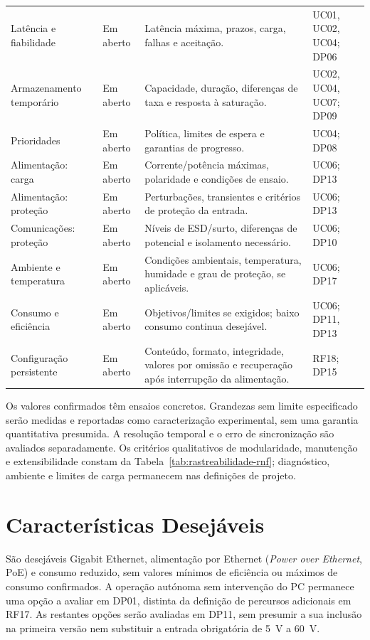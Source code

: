 \begin{longtable}{@{}>{\raggedright\arraybackslash}p{}>{\raggedright\arraybackslash}p{}>{\raggedright\arraybackslash}p{}>{\raggedright\arraybackslash}p{}@{}}
Latência e fiabilidade & Em aberto & Latência máxima, prazos, carga, falhas e aceitação. & UC01, UC02, UC04; DP06 \\
Armazenamento temporário & Em aberto & Capacidade, duração, diferenças de taxa e resposta à saturação. & UC02, UC04, UC07; DP09 \\
Prioridades & Em aberto & Política, limites de espera e garantias de progresso. & UC04; DP08 \\
Alimentação: carga & Em aberto & Corrente/potência máximas, polaridade e condições de ensaio. & UC06; DP13 \\
Alimentação: proteção & Em aberto & Perturbações, transientes e critérios de proteção da entrada. & UC06; DP13 \\
Comunicações: proteção & Em aberto & Níveis de ESD/surto, diferenças de potencial e isolamento necessário. & UC06; DP10 \\
Ambiente e temperatura & Em aberto & Condições ambientais, temperatura, humidade e grau de proteção, se aplicáveis. & UC06; DP17 \\
Consumo e eficiência & Em aberto & Objetivos/limites se exigidos; baixo consumo continua desejável. & UC06; DP11, DP13 \\
Configuração persistente & Em aberto & Conteúdo, formato, integridade, valores por omissão e recuperação após interrupção da alimentação. & RF18; DP15 \\
\end{longtable}
\endgroup

Os valores confirmados têm ensaios concretos. Grandezas sem limite
especificado serão medidas e reportadas como caracterização experimental,
sem uma garantia quantitativa presumida. A resolução temporal e o erro
de sincronização são avaliados separadamente. Os critérios qualitativos
de modularidade, manutenção e extensibilidade constam da
Tabela~\ref{tab:rastreabilidade-rnf}; diagnóstico, ambiente e limites
de carga permanecem nas definições de projeto.

\section{Características Desejáveis}

São desejáveis Gigabit Ethernet, alimentação por Ethernet
(\textit{Power over Ethernet}, PoE) e consumo reduzido, sem valores
mínimos de eficiência ou máximos de consumo confirmados. A operação
autónoma sem intervenção do PC permanece uma opção a avaliar em DP01,
distinta da definição de percursos adicionais em RF17. As restantes
opções serão avaliadas em DP11, sem presumir a sua inclusão
na primeira versão nem substituir a entrada obrigatória de 5~V a 60~V.

